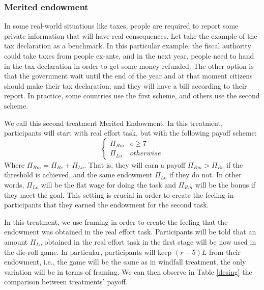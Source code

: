\documentclass[12pt,final]{article}
\begin{document}
\subsubsection{Merited endowment}
In some real-world situations like taxes, people are required to report some private information that will have real consequences. Let take the example of the tax declaration as a benchmark. In this particular example, the fiscal authority could take taxes from people ex-ante, and in the next year, people need to hand in the tax declaration in order to get some money refunded. The other option is that the government wait until the end of the year and at that moment citizens should make their tax declaration, and they will have a bill according to their report. In practice, some countries use the first scheme, and others use the second scheme. 

We call this second treatment Merited Endowment. In this treatment, participants will start with real effort task, but with the following payoff scheme: 
\[
\begin{cases} 
\Pi_{Rm} & e \ge 7 \\
\Pi_{Lo} & otherwise
\end{cases}\]
 Where $\Pi_{Rm}=\Pi_{Re}+\Pi_{Lo}$. That is, they will earn a payoff $\Pi_{Rm} > \Pi_{Re}$ if the threshold is achieved, and the same endowment $\Pi_{Lo}$  if they do not.  In other words, $\Pi_{Lo}$ will be the flat wage for doing the task and $\Pi_{Rm}$ will be the bonus if they meet the goal. This setting is crucial in order to create the feeling in participants that they earned the endowment for the second task.
 
In this treatment, we use framing in order to create the feeling that the endowment was obtained in the real effort task. Participants will be told that an amount $\Pi_{Lo}$ obtained in the real effort task in the first stage will be now used in the die-roll game. In particular, participants will keep $(r-5)L$ from their endowment, i.e., the game will be the same as in windfall treatment, the only variation will be in terms of framing. We can then observe in Table \ref{desing} the comparison between treatments' payoff.
\end{document}
